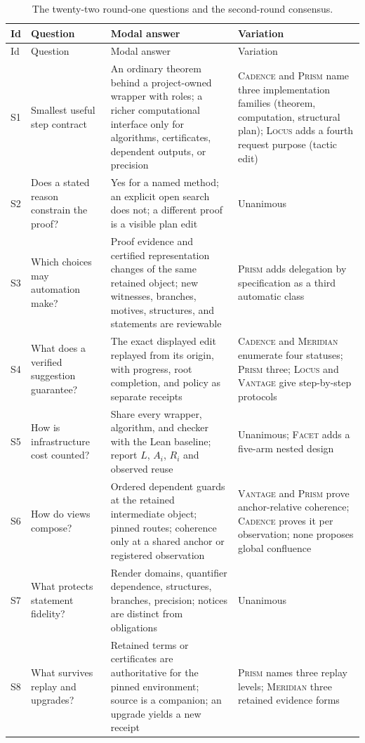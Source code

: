 \documentclass[11pt,a4paper]{article}
\newcommand{\Lc}{\textsc{Locus}}
\newcommand{\Cd}{\textsc{Cadence}}
\newcommand{\Fc}{\textsc{Facet}}
\newcommand{\Md}{\textsc{Meridian}}
\newcommand{\Pm}{\textsc{Prism}}
\newcommand{\Vt}{\textsc{Vantage}}
\theoremstyle{definition}
\begin{document}
\begingroup\small
\begin{longtable}{@{}L{8mm}L{32mm}L{60mm}L{47mm}@{}}
\caption{The twenty-two round-one questions and the second-round consensus.}\label{tab:questions}\\
\toprule
Id & Question & Modal answer & Variation\\
\midrule
\endfirsthead
\toprule
Id & Question & Modal answer & Variation\\
\midrule
\endhead
S1 & Smallest useful step contract & An ordinary theorem behind a project-owned wrapper with roles; a richer computational interface only for algorithms, certificates, dependent outputs, or precision & \Cd{} and \Pm{} name three implementation families (theorem, computation, structural plan); \Lc{} adds a fourth request purpose (tactic edit)\\
S2 & Does a stated reason constrain the proof? & Yes for a named method; an explicit open search does not; a different proof is a visible plan edit & Unanimous\\
S3 & Which choices may automation make? & Proof evidence and certified representation changes of the same retained object; new witnesses, branches, motives, structures, and statements are reviewable & \Pm{} adds delegation by specification as a third automatic class\\
S4 & What does a verified suggestion guarantee? & The exact displayed edit replayed from its origin, with progress, root completion, and policy as separate receipts & \Cd{} and \Md{} enumerate four statuses; \Pm{} three; \Lc{} and \Vt{} give step-by-step protocols\\
S5 & How is infrastructure cost counted? & Share every wrapper, algorithm, and checker with the Lean baseline; report $L$, $A_i$, $R_i$ and observed reuse & Unanimous; \Fc{} adds a five-arm nested design\\
S6 & How do views compose? & Ordered dependent guards at the retained intermediate object; pinned routes; coherence only at a shared anchor or registered observation & \Vt{} and \Pm{} prove anchor-relative coherence; \Cd{} proves it per observation; none proposes global confluence\\
S7 & What protects statement fidelity? & Render domains, quantifier dependence, structures, branches, precision; notices are distinct from obligations & Unanimous\\
S8 & What survives replay and upgrades? & Retained terms or certificates are authoritative for the pinned environment; source is a companion; an upgrade yields a new receipt & \Pm{} names three replay levels; \Md{} three retained evidence forms\\

\end{longtable}
\end{document}
